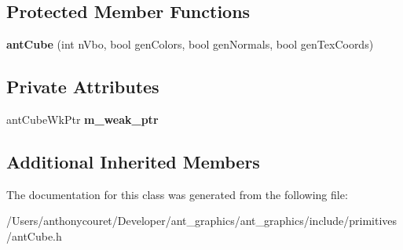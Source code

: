 \subsection*{Protected Member Functions}
\begin{DoxyCompactItemize}
\item 
\hypertarget{classant_cube_ad2676f4b7c056e4158fb8a3e1ba98a23}{{\bfseries ant\+Cube} (int n\+Vbo, bool gen\+Colors, bool gen\+Normals, bool gen\+Tex\+Coords)}\label{classant_cube_ad2676f4b7c056e4158fb8a3e1ba98a23}

\end{DoxyCompactItemize}
\subsection*{Private Attributes}
\begin{DoxyCompactItemize}
\item 
\hypertarget{classant_cube_a9f9a444abfbd29f48ed66924c35083d3}{ant\+Cube\+Wk\+Ptr {\bfseries m\+\_\+weak\+\_\+ptr}}\label{classant_cube_a9f9a444abfbd29f48ed66924c35083d3}

\end{DoxyCompactItemize}
\subsection*{Additional Inherited Members}


The documentation for this class was generated from the following file\+:\begin{DoxyCompactItemize}
\item 
/\+Users/anthonycouret/\+Developer/ant\+\_\+graphics/ant\+\_\+graphics/include/primitives/ant\+Cube.\+h\end{DoxyCompactItemize}
